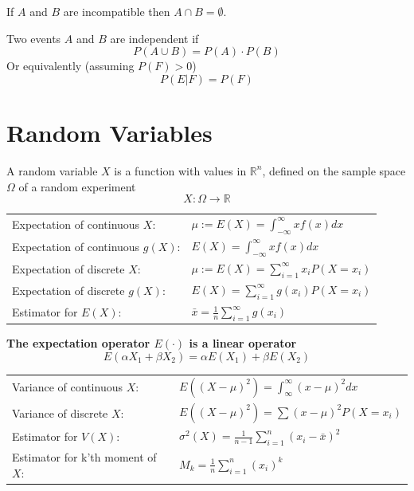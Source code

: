 \documentclass[11pt]{article}
\theoremstyle{definition}
\newcommand*\R{\mathbb{R}}
\begin{document}
If $A$ and $B$ are incompatible then $A\cap B = \emptyset$.
\begin{definition}
	Two events $A$ and $B$ are independent if
	\begin{equation*}
		P(A\cup B) = P(A)\cdot P(B)
	\end{equation*}
	Or equivalently (assuming $P(F)>0$)
	\begin{equation*}
		P(E|F) = P(F)
	\end{equation*}
\end{definition}

\section{Random Variables}

\begin{definition}
	A random variable $X$ is a function with values in $\R^n$, defined on the sample space $\Omega$ of a random experiment
	\begin{equation*}
		X: \Omega \rightarrow \R
	\end{equation*}
\end{definition}

\begin{tabularx}{\linewidth}{lX}
	Expectation of continuous $X$: & $\mu := E(X) = \int_{-\infty}^{\infty} x f(x) dx$\\
	Expectation of continuous $g(X)$: & $E(X) = \int_{-\infty}^{\infty} x f(x) dx$\\
	Expectation of discrete $X$: & $\mu := E(X) = \sum_{i=1}^{\infty} x_i P(X = x_i)$\\
	Expectation of discrete $g(X)$: & $E(X) = \sum_{i=1}^{\infty} g(x_i) P(X = x_i)$\\
	Estimator for $E(X)$: & $ \bar{x} = \frac{1}{n} \sum_{i=1}^{\infty} g(x_i)$
\end{tabularx}

\textbf{The expectation operator $E(\cdot)$ is a linear operator}
\begin{equation*}
E(\alpha X_1 + \beta X_2) = \alpha E(X_1) + \beta E(X_2)
\end{equation*}


\begin{tabularx}{\linewidth}{lX}
	Variance of continuous $X$: & $ E((X-\mu)^2) = \int_{\infty}^\infty (x-\mu)^2 dx $\\
	Variance of discrete $X$: & $ E((X-\mu)^2) = \sum (x-\mu)^2 P(X=x_i)  $\\
	Estimator for $V(X)$: & $\sigma^2(X) = \frac{1}{n-1} \sum_{i=1}^{n}(x_i - \bar{x})^2$\\
	Estimator for k'th moment of $X$: & $M_k = \frac{1}{n}\sum_{i=1}^{n}(x_i)^k$
\end{tabularx}
\end{document}
